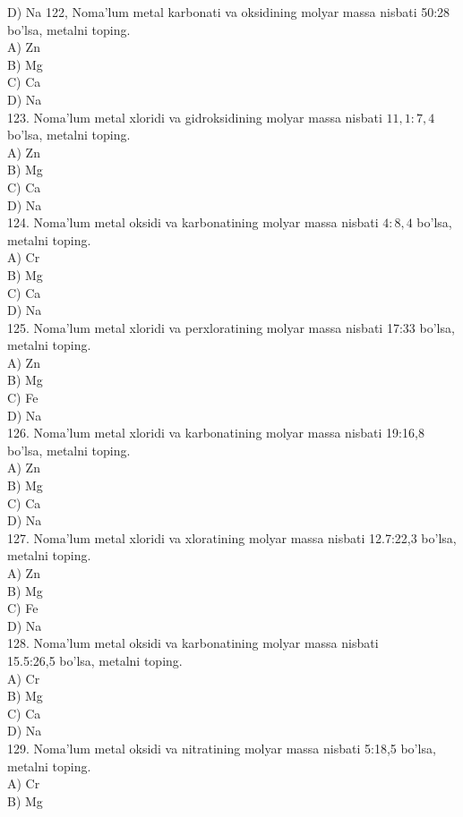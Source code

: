 D) Na
122, Noma'lum metal karbonati va oksidining molyar massa nisbati 50:28 bo'lsa, metalni toping.\\
A) Zn\\
B) Mg\\
C) Ca\\
D) Na\\
123. Noma'lum metal xloridi va gidroksidining molyar massa nisbati $11,1: 7,4$ bo'lsa, metalni toping.\\
A) Zn\\
B) Mg\\
C) Ca\\
D) Na\\
124. Noma'lum metal oksidi va karbonatining molyar massa nisbati $4: 8,4$ bo'lsa, metalni toping.\\
A) Cr\\
B) Mg\\
C) Ca\\
D) Na\\
125. Noma'lum metal xloridi va perxloratining molyar massa nisbati 17:33 bo'lsa, metalni toping.\\
A) Zn\\
B) Mg\\
C) Fe\\
D) Na\\
126. Noma'lum metal xloridi va karbonatining molyar massa nisbati 19:16,8 bo'lsa, metalni toping.\\
A) Zn\\
B) Mg\\
C) Ca\\
D) Na\\
127. Noma'lum metal xloridi va xloratining molyar massa nisbati 12.7:22,3 bo'lsa, metalni toping.\\
A) Zn\\
B) Mg\\
C) Fe\\
D) Na\\
128. Noma'lum metal oksidi va karbonatining molyar massa nisbati\\
15.5:26,5 bo'lsa, metalni toping.\\
A) Cr\\
B) Mg\\
C) Ca\\
D) Na\\
129. Noma'lum metal oksidi va nitratining molyar massa nisbati 5:18,5 bo'lsa, metalni toping.\\
A) Cr\\
B) Mg\\
